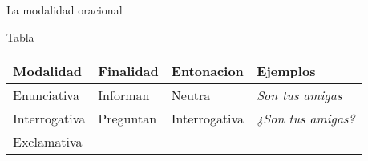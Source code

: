 \documentclass[ignorenonframetext,]{beamer}
\begin{document}
\begin{frame}{La modalidad oracional}
\protect\hypertarget{la-modalidad-oracional-1}{}

\begin{block}{Tabla}

\begin{longtable}[]{@{}llll@{}}
\toprule
\begin{minipage}[b]{0.15\columnwidth}\raggedright
\textbf{Modalidad}\strut
\end{minipage} & \begin{minipage}[b]{0.14\columnwidth}\raggedright
\textbf{Finalidad}\strut
\end{minipage} & \begin{minipage}[b]{0.18\columnwidth}\raggedright
\textbf{Entonacion}\strut
\end{minipage} & \begin{minipage}[b]{0.41\columnwidth}\raggedright
\textbf{Ejemplos}\strut
\end{minipage}\tabularnewline
\midrule
\endhead
\begin{minipage}[t]{0.15\columnwidth}\raggedright
Enunciativa\strut
\end{minipage} & \begin{minipage}[t]{0.14\columnwidth}\raggedright
Informan\strut
\end{minipage} & \begin{minipage}[t]{0.18\columnwidth}\raggedright
Neutra\strut
\end{minipage} & \begin{minipage}[t]{0.41\columnwidth}\raggedright
\emph{Son tus amigas}\strut
\end{minipage}\tabularnewline
\begin{minipage}[t]{0.15\columnwidth}\raggedright
Interrogativa\strut
\end{minipage} & \begin{minipage}[t]{0.14\columnwidth}\raggedright
Preguntan\strut
\end{minipage} & \begin{minipage}[t]{0.18\columnwidth}\raggedright
Interrogativa\strut
\end{minipage} & \begin{minipage}[t]{0.41\columnwidth}\raggedright
\emph{¿Son tus amigas?}\strut
\end{minipage}\tabularnewline
\begin{minipage}[t]{0.15\columnwidth}\raggedright
Exclamativa\strut
\end{minipage} & \begin{minipage}[t]{0.14\columnwidth}\raggedright

\end{minipage}
\end{longtable}
\end{block}
\end{frame}
\end{document}
